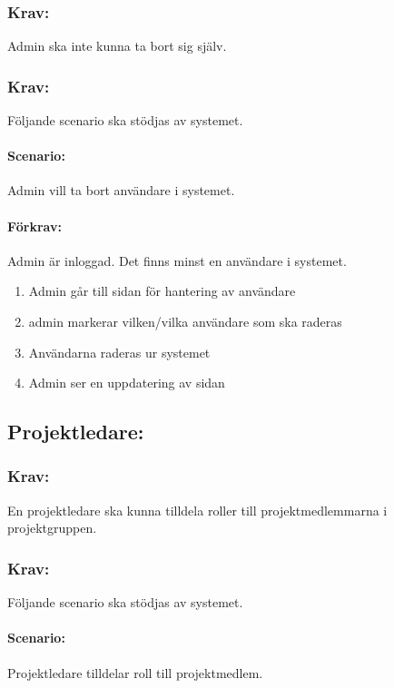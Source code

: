 \documentclass[paper=a4, fontsize=11pt,twoside]{article}
\begin{document}
\subsubsection{Krav:} Admin ska inte kunna ta bort sig själv.

\subsubsection{Krav:} Följande scenario ska stödjas av systemet. 
\paragraph{Scenario:}
Admin vill ta bort användare i systemet.
\paragraph{Förkrav:}
Admin är inloggad. Det finns minst en användare i systemet.
\begin{enumerate}
\item Admin går till sidan för hantering av användare
\item admin markerar vilken/vilka användare som ska raderas
\item Användarna raderas ur systemet
\item Admin ser en uppdatering av sidan
\end{enumerate}


\subsection{Projektledare:}

\subsubsection{Krav:} En projektledare ska kunna tilldela roller till projektmedlemmarna i projektgruppen.

\subsubsection{Krav:}
Följande scenario ska stödjas av systemet.
\paragraph{Scenario:}
Projektledare tilldelar roll till projektmedlem.
\end{document}
